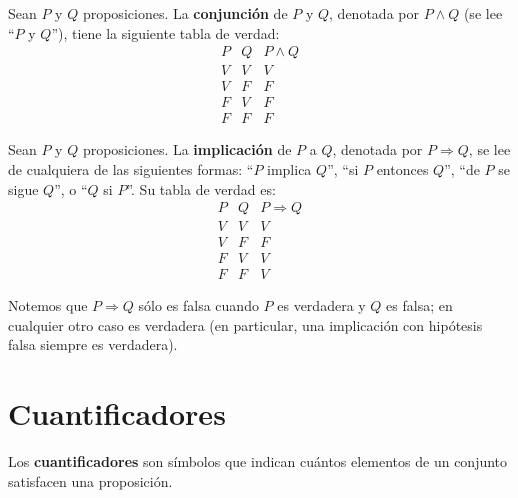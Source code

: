 \documentclass[12pt,a4paper]{book}
\begin{document}
    \begin{definicion}[Conjunción]
        Sean $P$ y $Q$ proposiciones. La \textbf{conjunción} de $P$ y $Q$, denotada por $P \wedge Q$ (se lee ``$P$ y $Q$''), tiene la siguiente tabla de verdad:
        \begin{equation*}
            \begin{array}{cc|c}
                P & Q & P \wedge Q \\ \hline
                V & V & V          \\
                V & F & F          \\
                F & V & F          \\
                F & F & F
            \end{array}
        \end{equation*}
    \end{definicion}

    \begin{definicion}[Implicación]
        Sean $P$ y $Q$ proposiciones. La \textbf{implicación} de $P$ a $Q$, denotada por $P \Rightarrow Q$, se lee de cualquiera de las siguientes formas: ``$P$ implica $Q$'', ``si $P$ entonces $Q$'', ``de $P$ se sigue $Q$'', o ``$Q$ si $P$''. Su tabla de verdad es:
        \begin{equation*}
            \begin{array}{cc|c}
                P & Q & P \Rightarrow Q \\ \hline
                V & V & V               \\
                V & F & F               \\
                F & V & V               \\
                F & F & V
            \end{array}
        \end{equation*}
    \end{definicion}

    Notemos que $P \Rightarrow Q$ sólo es falsa cuando $P$ es verdadera y $Q$ es falsa; en cualquier otro caso es verdadera (en particular, una implicación con hipótesis falsa siempre es verdadera).

    \section{Cuantificadores}

    Los \textbf{cuantificadores} son símbolos que indican cuántos elementos de un conjunto satisfacen una proposición.
\end{document}
